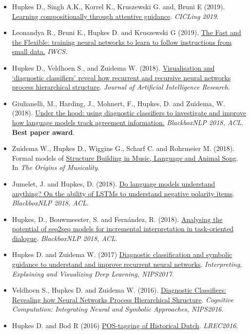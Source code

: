 \begin{itemize}
    \item  Hupkes D., Singh A.K., Korrel K., Kruszewski G. and, Bruni E (2019). \href{https://arxiv.org/abs/1805.09657}{Learning compositionally through attentive guidance}. \textit{CICLing 2019}.
    
    \item Leonandya R., Bruni E., Hupkes D. and Kruszewski G (2019). \href{https://www.aclweb.org/anthology/W19-0419/}{The Fast and the Flexible: training neural networks to learn to follow instructions from small data.} \textit{IWCS}. 
    
    \item Hupkes D., Veldhoen S., and Zuidema W. (2018). \href{https://jair.org/index.php/jair/article/view/11196/26408}{Visualisation and ‘diagnostic classifiers’ reveal how recurrent and recursive neural networks process hierarchical structure}. \textit{Journal of Artificial Intelligence Research}.
    
    \item Giulianelli, M., Harding, J., Mohnert, F., Hupkes, D. and Zuidema, W. (2018). \href{https://aclweb.org/anthology/W18-5426}{Under the hood: using diagnostic classifiers to investigate and improve how language models track agreement information.} \textit{BlackboxNLP 2018, ACL}. \\ \textbf{Best paper award}.
    
    \item Zuidema W., Hupkes D., Wiggins G., Scharf C. and Rohrmeier M. (2018). Formal models of \href{https://arxiv.org/abs/1901.05180}{Structure Building in Music, Language and Animal Song}. In \textit{The Origins of Musicality}.
    
    \item Jumelet, J. and Hupkes, D. (2018). \href{https://aclweb.org/anthology/W18-5424}{Do language models understand anything? On the ability of LSTMs to understand negative polarity items}. \textit{BlackboxNLP 2018, ACL}.
    
    \item Hupkes, D., Bouwmeester, S. and Fernández, R. (2018). \href{https://aclweb.org/anthology/W18-5419}{Analysing the potential of seq2seq models for incremental interpretation in task-oriented dialogue}. \textit{BlackboxNLP 2018, ACL}.
    
    \item Hupkes D. and Zuidema W. (2017) \href{http://www.interpretable-ml.org/nips2017workshop/papers/12.pdf}{Diagnostic classification and symbolic guidance to understand and improve recurrent neural networks}. \textit{Interpreting, Explaining and Visualizing Deep Learning, NIPS2017}.
    
    \item Veldhoen S., Hupkes D. and Zuidema W. (2016). \href{http://dieuwkehupkes.nl/research/nips2016.pdf}{Diagnostic Classifiers: Revealing how Neural
Networks Process Hierarchical Shructure}. \textit{Cognitive Computation: Integrating Neural and
Symbolic Approaches, NIPS2016}.

    \item Hupkes D. and Bod R (2016) \href{https://www.aclweb.org/anthology/L16-1012}{POS-tagging of Historical Dutch}. \textit{LREC2016}.
\end{itemize}
